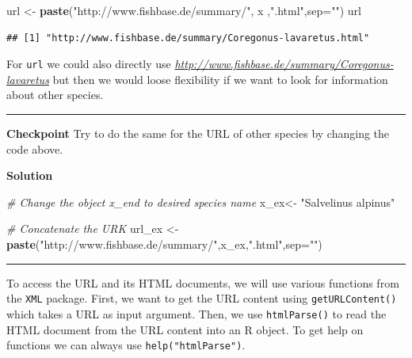\documentclass[
]{book}
\newenvironment{Shaded}{\begin{snugshade}}{\end{snugshade}}
\newcommand{\CommentTok}[1]{\textcolor[rgb]{0.56,0.35,0.01}{\textit{#1}}}
\newcommand{\DataTypeTok}[1]{\textcolor[rgb]{0.13,0.29,0.53}{#1}}
\newcommand{\KeywordTok}[1]{\textcolor[rgb]{0.13,0.29,0.53}{\textbf{#1}}}
\newcommand{\NormalTok}[1]{#1}
\newcommand{\OperatorTok}[1]{\textcolor[rgb]{0.81,0.36,0.00}{\textbf{#1}}}
\newcommand{\OtherTok}[1]{\textcolor[rgb]{0.56,0.35,0.01}{#1}}
\newcommand{\StringTok}[1]{\textcolor[rgb]{0.31,0.60,0.02}{#1}}
\begin{document}
\begin{Shaded}
\begin{Highlighting}[]
\NormalTok{url <-}\StringTok{ }\KeywordTok{paste}\NormalTok{(}\StringTok{"http://www.fishbase.de/summary/"}\NormalTok{, x ,}\StringTok{".html"}\NormalTok{,}\DataTypeTok{sep=}\StringTok{""}\NormalTok{)}
\NormalTok{url}
\end{Highlighting}
\end{Shaded}

\begin{verbatim}
## [1] "http://www.fishbase.de/summary/Coregonus-lavaretus.html"
\end{verbatim}

For \texttt{url} we could also directly use \emph{\url{http://www.fishbase.de/summary/Coregonus-lavaretus}} but then we would loose flexibility if we want to look for information about other species.

\begin{center}\rule{0.5\linewidth}{0.5pt}\end{center}

\textbf{Checkpoint}
Try to do the same for the URL of other species by changing the code above.

\textbf{Solution}

\begin{Shaded}
\begin{Highlighting}[]
\CommentTok{# Change the object x_end to desired species name}
\NormalTok{x_ex<-}\StringTok{ "Salvelinus alpinus"}

\CommentTok{# Concatenate the URK}
\NormalTok{url_ex <-}\StringTok{ }\KeywordTok{paste}\NormalTok{(}\StringTok{"http://www.fishbase.de/summary/"}\NormalTok{,x_ex,}\StringTok{".html"}\NormalTok{,}\DataTypeTok{sep=}\StringTok{""}\NormalTok{)}
\end{Highlighting}
\end{Shaded}

\begin{center}\rule{0.5\linewidth}{0.5pt}\end{center}

To access the URL and its HTML documents, we will use various functions from the \texttt{XML} package. First, we want to get the URL content using \texttt{getURLContent()} which takes a URL as input argument. Then, we use \texttt{htmlParse()} to read the HTML document from the URL content into an R object. To get help on functions we can always use \texttt{help("htmlParse")}.

\begin{Shaded}
\end{Shaded}
\end{document}
